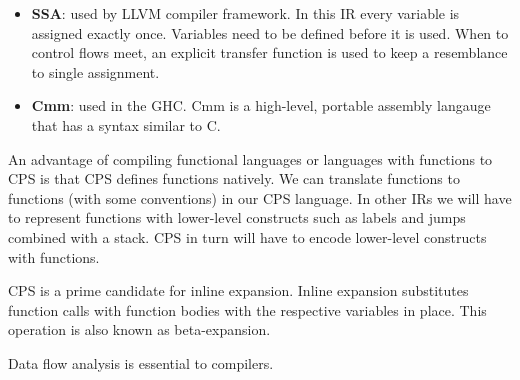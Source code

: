 \begin{itemize}
\item \textbf{SSA}\autocite{DBLP:journals/toplas/CytronFRWZ91}: used by LLVM\autocite{llvmlangref} compiler framework. In this \ac{IR} every variable is assigned exactly once. Variables need to be defined before it is used. When to control flows meet, an explicit transfer function is used to keep a resemblance to single assignment.
\item \textbf{Cmm}\autocite{DBLP:conf/ppdp/JonesRR99, haskellcmm}: used in the \ac{GHC}. Cmm is a high-level, portable assembly langauge that has a syntax similar to C.
\end{itemize}

An advantage of compiling functional languages or languages with functions to \ac{CPS} is that \ac{CPS} defines functions natively. We can translate functions to functions (with some conventions) in our \ac{CPS} language. In other \acp{IR} we will have to represent functions with lower-level constructs such as labels and jumps combined with a stack. \ac{CPS} in turn will have to encode lower-level constructs with functions.

\ac{CPS} is a prime candidate for inline expansion. Inline expansion substitutes function calls with function bodies with the respective variables in place. This operation is also known as beta-expansion.

Data flow analysis is essential to compilers.